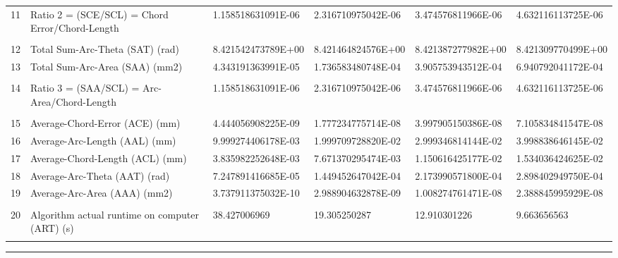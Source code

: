 \begin{landscape}
\begin{table}[ht]
{\begin{tabular}{ p{0.2cm} p{8.80cm} p{4.00cm} p{4.0cm} p{4.00cm} p{4.0cm}}
11	&	Ratio 2 = (SCE/SCL) = Chord Error/Chord-Length	&	1.158518631091E-06	&	2.316710975042E-06	&	3.474576811966E-06	&	4.632116113725E-06	\\
&		&		&		&		&		\\
12	&	Total Sum-Arc-Theta (SAT) (rad)	&	8.421542473789E+00	&	8.421464824576E+00	&	8.421387277982E+00	&	8.421309770499E+00	\\
13	&	Total Sum-Arc-Area (SAA) (mm2)	&	4.343191363991E-05	&	1.736583480748E-04	&	3.905753943512E-04	&	6.940792041172E-04	\\
&		&		&		&		&		\\
14	&	Ratio 3 = (SAA/SCL) = Arc-Area/Chord-Length	&	1.158518631091E-06	&	2.316710975042E-06	&	3.474576811966E-06	&	4.632116113725E-06	\\
&		&		&		&		&		\\
15	&	Average-Chord-Error (ACE) (mm)	&	4.444056908225E-09	&	1.777234775714E-08	&	3.997905150386E-08	&	7.105834841547E-08	\\
16	&	Average-Arc-Length (AAL) (mm)	&	9.999274406178E-03	&	1.999709728820E-02	&	2.999346814144E-02	&	3.998838646145E-02	\\
17	&	Average-Chord-Length (ACL) (mm)	&	3.835982252648E-03	&	7.671370295474E-03	&	1.150616425177E-02	&	1.534036424625E-02	\\
18	&	Average-Arc-Theta (AAT) (rad)	&	7.247891416685E-05	&	1.449452647042E-04	&	2.173990571800E-04	&	2.898402949750E-04	\\
19	&	Average-Arc-Area (AAA) (mm2)	&	3.737911375032E-10	&	2.988904632878E-09	&	1.008274761471E-08	&	2.388845995929E-08	\\
&		&		&		&		&		\\
20	&	Algorithm actual runtime on computer (ART) (s) 	&	38.427006969	&	19.305250287	&	12.910301226	&	9.663656563	\\
&		&		&		&		&		

\end{tabular}
			
}   %
\hrule
\end{table}
\end{landscape}

